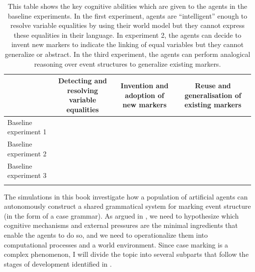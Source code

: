 \begin{table}[t]

\begin{tabular}[c]{p{2.5cm}ccc}
 \lsptoprule
 & \parbox{3cm}{\raggedright Detecting and resolving variable equalities} 
	&\parbox{2.5cm}{\raggedright Invention and adoption of new markers}
		&\parbox{3cm}{\raggedright Reuse and generalisation of existing markers} \\
		\midrule
\raggedright Baseline experiment 1 & \raisebox{-.5\height}{$+$}& \raisebox{-.5\height}{$-$} &\raisebox{-.5\height}{$-$} \\
\raggedright Baseline experiment 2 & \raisebox{-.5\height}{$+$}& \raisebox{-.5\height}{$+$} &\raisebox{-.5\height}{$-$} \\
\raggedright Baseline experiment 3 & \raisebox{-.5\height}{$+$} & \raisebox{-.5\height}{$+$} &\raisebox{-.5\height}{$+$}\\
 \lspbottomrule
\end{tabular}



\caption[Key cognitive abilities in the baseline experiments]{This table shows the key cognitive abilities which are given to the agents in the baseline experiments. In the first experiment, agents are ``intelligent'' enough to resolve variable equalities by using their world model but they cannot express these equalities in their language. In experiment 2, the agents can decide to invent new markers to indicate the linking of equal variables but they cannot generalize or abstract. In the third experiment, the agents can perform analogical reasoning over event structures to generalize existing markers.}
\label{t:repairs}
\end{table}

The simulations in this book investigate how a population of artificial agents can autonomously construct a shared grammatical system for marking event structure (in the form of a case grammar). As argued in , we need to hypothesize which cognitive mechanisms and external pressures are the minimal ingredients that enable the agents to do so, and we need to operationalize them into computational processes and a world environment. Since case marking is a complex phenomenon, I will divide the topic into several subparts that follow the stages of development identified in .

